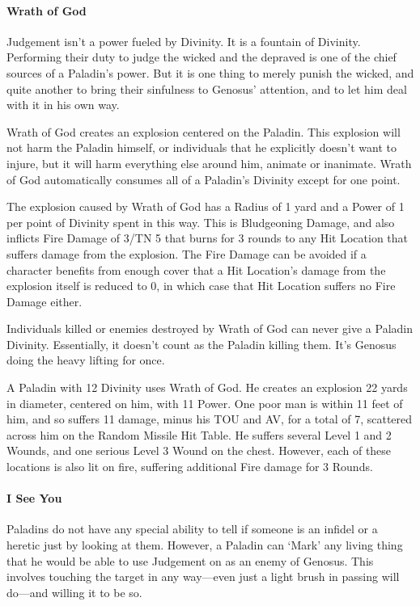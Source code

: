 \documentclass[oneside,11pt,english]{book}
\begin{document}
\paragraph{Wrath of God}
Judgement isn't a power fueled by Divinity. It is a fountain of Divinity. Performing their duty to 
judge the wicked and the depraved is one of the chief sources of a Paladin's power. But it is one 
thing to merely punish the wicked, and quite another to bring their sinfulness to Genosus’ 
attention, and to let him deal with it in his own way. 


Wrath of God creates an explosion centered on the Paladin. This explosion will not harm the 
Paladin himself, or individuals that he explicitly doesn't want to injure, but it will harm 
everything else around him, animate or inanimate. Wrath of God automatically consumes all of a 
Paladin's Divinity except for one point. 


The explosion caused by Wrath of God has a Radius of 1 yard and a Power of 1 per point of 
Divinity spent in this way. This is Bludgeoning Damage, and also inflicts Fire Damage of 3/TN 5 
that burns for 3 rounds to any Hit Location that suffers damage from the explosion. The Fire 
Damage can be avoided if a character benefits from enough cover that a Hit Location's damage 
from the explosion itself is reduced to 0, in which case that Hit Location suffers no Fire Damage 
either. 


Individuals killed or enemies destroyed by Wrath of God can never give a Paladin Divinity. 
Essentially, it doesn't count as the Paladin killing them. It's Genosus doing the heavy lifting for 
once. 


A Paladin with 12 Divinity uses Wrath of God. He creates an explosion 22 yards in diameter, centered on him, with 11 
Power. One poor man is within 11 feet of him, and so suffers 11 damage, minus his TOU and AV, for a total of 7, 
scattered across him on the Random Missile Hit Table. He suffers several Level 1 and 2 Wounds, and one serious Level 
3 Wound on the chest. However, each of these locations is also lit on fire, suffering additional Fire damage for 3 
Rounds. 
 
\paragraph{I See You}
Paladins do not have any special ability to tell if someone is an infidel or a heretic just by looking 
at them. However, a Paladin can ‘Mark’ any living thing that he would be able to use Judgement 
on as an enemy of Genosus. This involves touching the target in any way—even just a light brush in passing will do—and willing it to be so.
\end{document}
